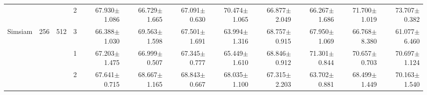 \begin{table}[htpb]
{\begin{tabular}{c|c|c|c|rr|rr|rr|rr}
                                 &                                                                                 &                                                                                        & 2                                                                                         & 67.930$\pm$1.086                        & 66.729$\pm$1.665                        & 67.091$\pm$0.630                        & 70.474$\pm$1.065                        & 66.877$\pm$2.049                        & 66.267$\pm$1.686                        & 71.700$\pm$1.019                        & 73.707$\pm$0.382                       \\
\multirow{-12}{*}{Simsiam}       & \multirow{-6}{*}{256}                                                           & \multirow{-3}{*}{512}                                                                  & 3                                                                                         & 66.388$\pm$1.030                        & 69.563$\pm$1.598                        & 67.501$\pm$1.691                        & 63.994$\pm$1.316                        & 68.757$\pm$0.915                        & 67.950$\pm$1.069                        & 66.768$\pm$8.380                        & 61.077$\pm$6.460                       \\ \hline
                                 &                                                                                 &                                                                                        & 1                                                                                         & 67.203$\pm$1.475                        & 66.999$\pm$0.507                        & 67.345$\pm$0.777                        & 65.449$\pm$1.610                        & 68.846$\pm$0.912                        & 71.301$\pm$0.844                        & 70.657$\pm$0.703                        & 70.697$\pm$1.124                       \\
                                 &                                                                                 &                                                                                        & 2                                                                                         & 67.641$\pm$0.715                        & 68.667$\pm$1.165                        & 68.843$\pm$0.667                        & 68.035$\pm$1.100                        & 67.315$\pm$2.203                        & 63.702$\pm$0.881                        & 68.499$\pm$1.449                        & 70.163$\pm$1.540                       \\

\end{tabular}}
\end{table}
